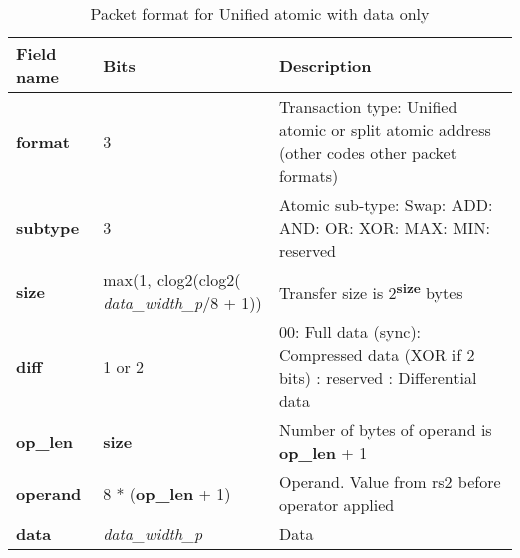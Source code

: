 \begin{table}[htp]
  \centering
  \caption{Packet format for Unified atomic with data only}
  \label{tab:te_datadx0y7}
  \begin{tabulary}{\textwidth}{|l|p{38mm}|p{92mm}|}
    \hline
    {\bf Field name} & {\bf Bits} & {\bf Description} \\
    \hline
    \textbf{format} & 	3	& Transaction type: Unified atomic or split atomic address\newline	
		(other codes other packet formats)\\
    \hline
    \textbf{subtype} & 	3	& Atomic sub-type: Swap: ADD: AND: OR: XOR: MAX: MIN: reserved\\	
    \hline
    \textbf{size} & max(1, clog2(clog2( \textit{data\_width\_p}/8 + 1)) & Transfer size is 2\textsuperscript{\textbf{size}} bytes\\
    \hline
    \textbf{diff} & 1 or 2 & 00: Full data (sync): Compressed data (XOR if 2 bits) : reserved : Differential data\\
    \hline
    \textbf{op\_len} & \textbf{size} & Number of bytes of operand is \textbf{op\_len} + 1\\
    \hline
    \textbf{operand}	& 8 * (\textbf{op\_len} + 1) & Operand.  Value from rs2 before operator applied\\
    \hline
    \textbf{data} & \textit{data\_width\_p} & 
                Data\\
    \hline
  \end{tabulary}
\end{table}


